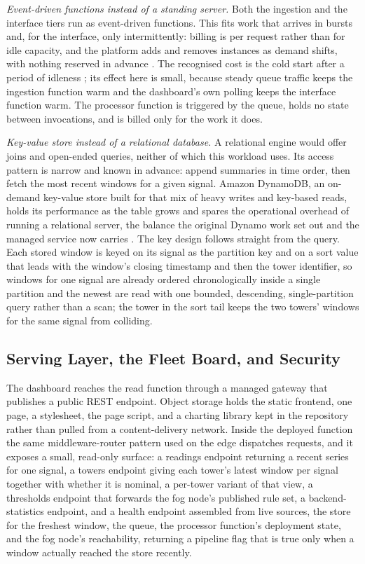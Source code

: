 \documentclass[conference]{IEEEtran}
\begin{document}
\textit{Event-driven functions instead of a standing server.} Both the ingestion and the interface tiers run as event-driven functions. This fits work that arrives in bursts and, for the interface, only intermittently: billing is per request rather than for idle capacity, and the platform adds and removes instances as demand shifts, with nothing reserved in advance \cite{armbrust2010}. The recognised cost is the cold start after a period of idleness \cite{wang2018}; its effect here is small, because steady queue traffic keeps the ingestion function warm and the dashboard's own polling keeps the interface function warm. The processor function is triggered by the queue, holds no state between invocations, and is billed only for the work it does.

\textit{Key-value store instead of a relational database.} A relational engine would offer joins and open-ended queries, neither of which this workload uses. Its access pattern is narrow and known in advance: append summaries in time order, then fetch the most recent windows for a given signal. Amazon DynamoDB, an on-demand key-value store built for that mix of heavy writes and key-based reads, holds its performance as the table grows and spares the operational overhead of running a relational server, the balance the original Dynamo work set out and the managed service now carries \cite{decandia2007, elhemali2022}. The key design follows straight from the query. Each stored window is keyed on its signal as the partition key and on a sort value that leads with the window's closing timestamp and then the tower identifier, so windows for one signal are already ordered chronologically inside a single partition and the newest are read with one bounded, descending, single-partition query rather than a scan; the tower in the sort tail keeps the two towers' windows for the same signal from colliding.

\subsection{Serving Layer, the Fleet Board, and Security}

The dashboard reaches the read function through a managed gateway that publishes a public REST endpoint. Object storage holds the static frontend, one page, a stylesheet, the page script, and a charting library kept in the repository rather than pulled from a content-delivery network. Inside the deployed function the same middleware-router pattern used on the edge dispatches requests, and it exposes a small, read-only surface: a readings endpoint returning a recent series for one signal, a towers endpoint giving each tower's latest window per signal together with whether it is nominal, a per-tower variant of that view, a thresholds endpoint that forwards the fog node's published rule set, a backend-statistics endpoint, and a health endpoint assembled from live sources, the store for the freshest window, the queue, the processor function's deployment state, and the fog node's reachability, returning a pipeline flag that is true only when a window actually reached the store recently.
\end{document}
